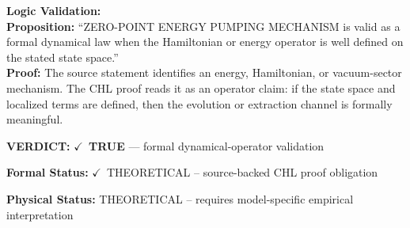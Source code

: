 \textbf{Logic Validation:}\\
\textbf{Proposition:} ``ZERO-POINT ENERGY PUMPING MECHANISM is valid as a formal dynamical law when the
Hamiltonian or energy operator is well defined on the stated state space.''\\
\textbf{Proof:} The source statement identifies an energy, Hamiltonian, or vacuum-sector mechanism. The
CHL proof reads it as an operator claim: if the state space and localized terms are
defined, then the evolution or extraction channel is formally meaningful.

\textbf{VERDICT:} \ensuremath{\checkmark}\ \textbf{TRUE} --- formal dynamical-operator validation

\textbf{Formal Status:} \ensuremath{\checkmark}\ THEORETICAL -- source-backed CHL proof obligation

\textbf{Physical Status:} THEORETICAL -- requires model-specific empirical interpretation
\par\vspace{0.45em}
\par
\ifTZPDarkEdition
{}
\fi
\endgroup
\endgroup
